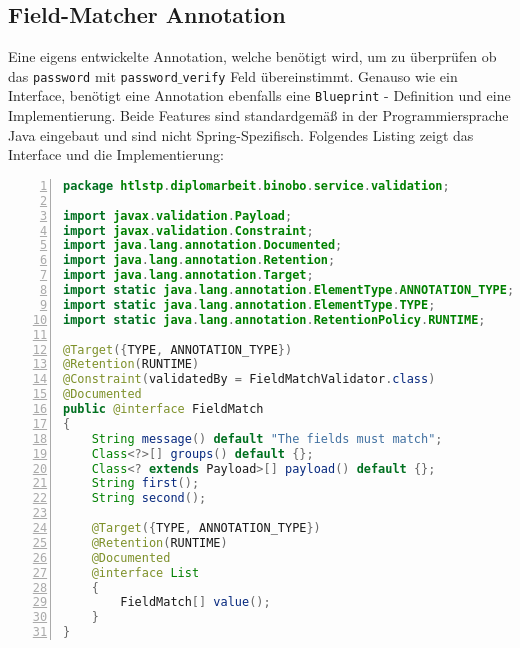 \documentclass[paper=a4,12pt]{scrreprt}
\begin{document}
\subsection{Field-Matcher Annotation}

Eine eigens entwickelte Annotation, welche benötigt wird, um zu überprüfen ob das \texttt{password} mit \texttt{password$\_$verify} Feld übereinstimmt.\newline
Genauso wie ein Interface, benötigt eine Annotation ebenfalls eine \texttt{Blueprint} - Definition und eine Implementierung. Beide Features sind standardgemäß in der Programmiersprache Java
eingebaut und sind nicht Spring-Spezifisch. Folgendes Listing zeigt das Interface und die Implementierung:\newline


\begin{lstlisting}[caption={FieldMatch Annotation}, captionpos=b, label={listing:field_match_anno}, language=java, numbers=left,
  stepnumber=1]
package htlstp.diplomarbeit.binobo.service.validation;

import javax.validation.Payload;
import javax.validation.Constraint;
import java.lang.annotation.Documented;
import java.lang.annotation.Retention;
import java.lang.annotation.Target;
import static java.lang.annotation.ElementType.ANNOTATION_TYPE;
import static java.lang.annotation.ElementType.TYPE;
import static java.lang.annotation.RetentionPolicy.RUNTIME;

@Target({TYPE, ANNOTATION_TYPE})
@Retention(RUNTIME)
@Constraint(validatedBy = FieldMatchValidator.class)
@Documented
public @interface FieldMatch
{
    String message() default "The fields must match";
    Class<?>[] groups() default {};
    Class<? extends Payload>[] payload() default {};
    String first();
    String second();

    @Target({TYPE, ANNOTATION_TYPE})
    @Retention(RUNTIME)
    @Documented
    @interface List
    {
        FieldMatch[] value();
    }
}
\end{lstlisting}
\end{document}
